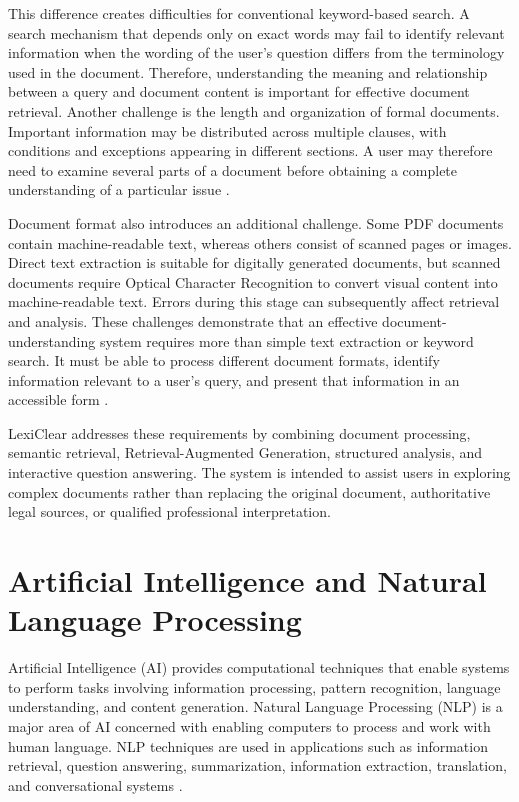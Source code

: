 \documentclass[12pt,a4paper,oneside]{report}
\begin{document}
This difference creates difficulties for conventional keyword-based search.
A search mechanism that depends only on exact words may fail to identify
relevant information when the wording of the user's question differs from
the terminology used in the document. Therefore, understanding the meaning
and relationship between a query and document content is important for
effective document retrieval. Another challenge is the length and organization of formal documents.
Important information may be distributed across multiple clauses, with
conditions and exceptions appearing in different sections. A user may
therefore need to examine several parts of a document before obtaining a
complete understanding of a particular issue \cite{reimers2019sbert}.

Document format also introduces an additional challenge. Some PDF documents
contain machine-readable text, whereas others consist of scanned pages or
images. Direct text extraction is suitable for digitally generated
documents, but scanned documents require Optical Character Recognition to
convert visual content into machine-readable text. Errors during this stage
can subsequently affect retrieval and analysis. These challenges demonstrate that an effective document-understanding system
requires more than simple text extraction or keyword search. It must be able
to process different document formats, identify information relevant to a
user's query, and present that information in an accessible form \cite{pramanik2025}.

LexiClear addresses these requirements by combining document processing,
semantic retrieval, Retrieval-Augmented Generation, structured analysis, and
interactive question answering. The system is intended to assist users in exploring complex
documents rather than replacing the original document, authoritative legal
sources, or qualified professional interpretation.

\section{Artificial Intelligence and Natural Language Processing}

Artificial Intelligence (AI) provides computational techniques that enable
systems to perform tasks involving information processing, pattern
recognition, language understanding, and content generation. Natural Language
Processing (NLP) is a major area of AI concerned with enabling computers to
process and work with human language. NLP techniques are used in applications
such as information retrieval, question answering, summarization,
information extraction, translation, and conversational systems \cite{bommarito2018lexnlp}.
\end{document}
